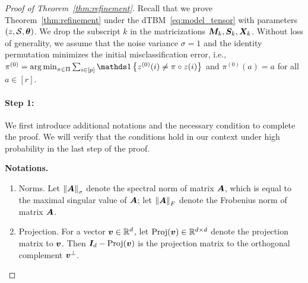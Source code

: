 \documentclass[lettersize,onecolumn,journal]{IEEEtran}
\theoremstyle{definition}
\theoremstyle{definition}
\newcommand{\offf}[1]{\left\{#1\right\}}
\begin{document}
\begin{proof}[Proof of Theorem~\ref{thm:refinement}]
Recall that we prove Theorem~\ref{thm:refinement} under the dTBM~\ref{eq:model_tensor} with parameters $(z, \mathcal{S}, \boldsymbol{\theta})$. We drop the subscript $k$ in the matricizations $\bm M_k, \bm S_k, \bm X_k$. Without loss of generality, we assume that the noise variance $\sigma = 1$ and the identity permutation minimizes the initial misclassification error, i.e., $\pi^{(0)} = \argmin_{\pi \in \Pi} \sum_{i \in [p]}\ind \offf{z^{(0)}(i) \neq \pi \circ z(i) }$ and $\pi^{(0)}(a) = a$ for all $ a \in [r]$.



\paragraph{Step 1:} We first introduce additional notations and the necessary condition to complete the proof. We will verify that the conditions hold in our context under high probability in the last step of the proof. 

\textbf{Notations.}
\begin{enumerate}

\item Norms. Let $\left\lVert\bm A\right\rVert_\sigma$ denote the spectral norm of matrix $\bm A$, which is equal to the maximal singular value of $\bm A$; let $\left\lVert\bm A\right\rVert_F$ denote the Frobenius norm of matrix $\bm A$.
\item Projection. For a vector $\bm{v} \in \mathbb{R}^d$, let $\text{Proj}(\bm{v}) \in \mathbb{R}^{d \times d}$ denote the projection matrix to $\bm{v}$. Then $\bm I_d - \text{Proj}(\bm{v})$ is the projection matrix to the orthogonal complement $\bm{v}^{\perp}$. 


\end{enumerate}
\end{proof}
\end{document}
